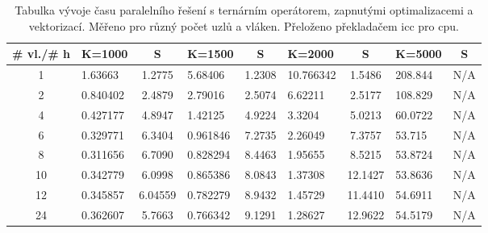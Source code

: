 \documentclass[a4paper,11pt]{article}
\begin{document}
   \begin{table}[ht]
  \begin{center}
   \begin{tabular}{|c|l|c|l|c|l|c|l|c|}
    \hline 
    \# vl./\# h & K=1000 & S & K=1500 & S & K=2000 & S & K=5000 & S\\
   \hline 
   \hline 
   1 & 1.63663 & 1.2775 & 5.68406 & 1.2308 & 10.766342 & 1.5486 & 208.844 & N/A \\
   \hline
    2 & 0.840402 & 2.4879 & 2.79016 & 2.5074 & 6.62211 & 2.5177 & 108.829 & N/A\\
   \hline
    4 & 0.427177 & 4.8947 & 1.42125 & 4.9224 & 3.3204 & 5.0213 & 60.0722 & N/A\\
   \hline
    6 & 0.329771 & 6.3404 & 0.961846 & 7.2735 & 2.26049 & 7.3757 & 53.715 & N/A\\
   \hline
    8 & 0.311656 & 6.7090 & 0.828294 & 8.4463 & 1.95655 & 8.5215 & 53.8724 & N/A\\
      \hline
    10 & 0.342779 & 6.0998 & 0.865386 & 8.0843 & 1.37308 & 12.1427 & 53.8636 & N/A\\ 
      \hline
    12 & 0.345857 & 6.04559 & 0.782279 & 8.9432 & 1.45729 & 11.4410 & 54.6911 & N/A\\
      \hline
    24 & 0.362607 & 5.7663 & 0.766342 & 9.1291 & 1.28627 & 12.9622 & 54.5179 & N/A\\
   \hline    
    \end{tabular}
   \caption{Tabulka vývoje času paralelního řešení s ternárním operátorem, zapnutými optimalizacemi a vektorizací. Měřeno pro různý počet uzlů a vláken. Přeloženo 
   překladačem icc pro cpu.} 
   \label{tab.tab21}
  \end{center}   
  \end{table}
  
\end{document}
